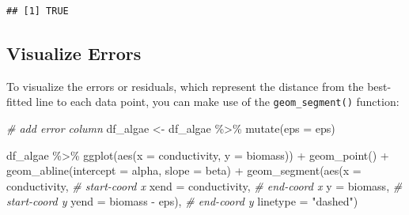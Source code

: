 \documentclass[
]{book}
\newenvironment{Shaded}{\begin{snugshade}}{\end{snugshade}}
\newcommand{\AttributeTok}[1]{\textcolor[rgb]{0.77,0.63,0.00}{#1}}
\newcommand{\CommentTok}[1]{\textcolor[rgb]{0.56,0.35,0.01}{\textit{#1}}}
\newcommand{\FunctionTok}[1]{\textcolor[rgb]{0.00,0.00,0.00}{#1}}
\newcommand{\NormalTok}[1]{#1}
\newcommand{\OtherTok}[1]{\textcolor[rgb]{0.56,0.35,0.01}{#1}}
\newcommand{\SpecialCharTok}[1]{\textcolor[rgb]{0.00,0.00,0.00}{#1}}
\newcommand{\StringTok}[1]{\textcolor[rgb]{0.31,0.60,0.02}{#1}}
\begin{document}
\begin{verbatim}
## [1] TRUE
\end{verbatim}

\hypertarget{visualize-errors}{%
\subsection{Visualize Errors}\label{visualize-errors}}

To visualize the errors or residuals, which represent the distance from the best-fitted line to each data point, you can make use of the \texttt{geom\_segment()} function:

\begin{Shaded}
\begin{Highlighting}[]
\CommentTok{\# add error column}
\NormalTok{df\_algae }\OtherTok{\textless{}{-}}\NormalTok{ df\_algae }\SpecialCharTok{\%\textgreater{}\%} 
  \FunctionTok{mutate}\NormalTok{(}\AttributeTok{eps =}\NormalTok{ eps)}

\NormalTok{df\_algae }\SpecialCharTok{\%\textgreater{}\%} 
  \FunctionTok{ggplot}\NormalTok{(}\FunctionTok{aes}\NormalTok{(}\AttributeTok{x =}\NormalTok{ conductivity,}
             \AttributeTok{y =}\NormalTok{ biomass)) }\SpecialCharTok{+}
  \FunctionTok{geom\_point}\NormalTok{() }\SpecialCharTok{+}
  \FunctionTok{geom\_abline}\NormalTok{(}\AttributeTok{intercept =}\NormalTok{ alpha,}
              \AttributeTok{slope =}\NormalTok{ beta) }\SpecialCharTok{+} 
  \FunctionTok{geom\_segment}\NormalTok{(}\FunctionTok{aes}\NormalTok{(}\AttributeTok{x =}\NormalTok{ conductivity, }\CommentTok{\# start{-}coord x}
                   \AttributeTok{xend =}\NormalTok{ conductivity, }\CommentTok{\# end{-}coord x}
                   \AttributeTok{y =}\NormalTok{ biomass, }\CommentTok{\# start{-}coord y}
                   \AttributeTok{yend =}\NormalTok{ biomass }\SpecialCharTok{{-}}\NormalTok{ eps), }\CommentTok{\# end{-}coord y}
               \AttributeTok{linetype =} \StringTok{"dashed"}\NormalTok{)}
\end{Highlighting}
\end{Shaded}
\end{document}
